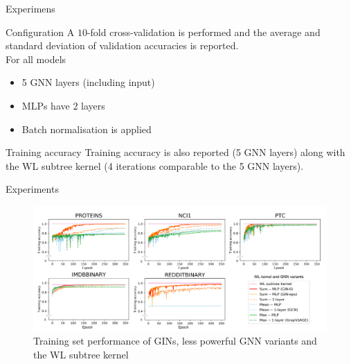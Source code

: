 \documentclass{beamer}
\theoremstyle{definition}
\begin{document}
\begin{frame}{Experimens}
    \begin{block}{Configuration}
        A \(10\)-fold cross-validation is performed and the average and standard deviation of validation accuracies is reported.\\
        \bigskip
        For all models
        \begin{itemize}
            \item 5 GNN layers (including input)
            \item MLPs have \(2\) layers
            \item Batch normalisation is applied
        \end{itemize}
    \end{block}
    \begin{block}{Training accuracy}
        Training accuracy is also reported (5 GNN layers) along with the WL subtree kernel (4 iterations comparable to the 5 GNN layers).
    \end{block}
\end{frame}

\begin{frame}{Experiments}
    \begin{figure}
        \centering
        \includegraphics[scale=1]{gins_training_set_perf.png}
        \caption{Training set performance of GINs, less powerful GNN variants and the WL subtree kernel}
    \end{figure}
\end{frame}
\end{document}
